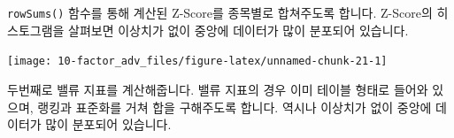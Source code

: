 \documentclass[12pt,]{book}
\newenvironment{Shaded}{\begin{snugshade}}{\end{snugshade}}
\newcommand{\DataTypeTok}[1]{\textcolor[rgb]{0.13,0.29,0.53}{#1}}
\newcommand{\KeywordTok}[1]{\textcolor[rgb]{0.13,0.29,0.53}{\textbf{#1}}}
\newcommand{\NormalTok}[1]{#1}
\newcommand{\OperatorTok}[1]{\textcolor[rgb]{0.81,0.36,0.00}{\textbf{#1}}}
\newcommand{\StringTok}[1]{\textcolor[rgb]{0.31,0.60,0.02}{#1}}
\begin{document}
\texttt{rowSums()} 함수를 통해 계산된 Z-Score를 종목별로 합쳐주도록 합니다. Z-Score의 히스토그램을 살펴보면 이상치가 없이 중앙에 데이터가 많이 분포되어 있습니다.

\begin{Shaded}
\end{Shaded}

\begin{center}\texttt{[image: 10-factor\_adv\_files/figure-latex/unnamed-chunk-21-1]} \end{center}

두번째로 밸류 지표를 계산해줍니다. 밸류 지표의 경우 이미 테이블 형태로 들어와 있으며, 랭킹과 표준화를 거쳐 합을 구해주도록 합니다. 역시나 이상치가 없이 중앙에 데이터가 많이 분포되어 있습니다.
\end{document}
